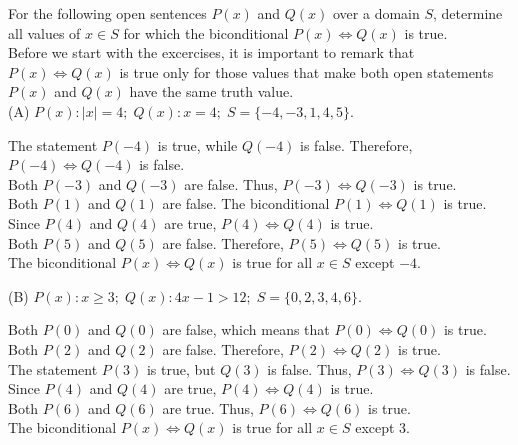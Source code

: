 \documentclass[12pt]{article}
\newenvironment{problem}[2][Problem]{\begin{trivlist}
		\item[\hskip \labelsep {\bfseries #1}\hskip \labelsep {\bfseries #2.}]}{\end{trivlist}}
\newenvironment{solution}[2][Solution]{\begin{trivlist}
		\item[\hskip \labelsep {\bfseries #1}\hskip \labelsep {\bfseries #2.}]}{\end{trivlist}}
\begin{document}
\begin{problem}{39}
	For the following open sentences $P(x)$ and $Q(x)$ over a domain $S$, determine all values of $x \in S$ for which the biconditional $P(x) \Leftrightarrow Q(x)$ is true.\\
	
	Before we start with the excercises, it is important to remark that $P(x) \Leftrightarrow Q(x)$ is true only for those values that make both open statements $P(x)$ and $Q(x)$ have the same truth value.\\
	
	(A) $P(x): \vert{x}\vert = 4; \; Q(x) : x = 4; \; S = \{-4, -3, 1, 4, 5\}.$	
	\begin{solution}{a}
		The statement $P(-4)$ is true, while $Q(-4)$ is false. Therefore, $P(-4) \Leftrightarrow Q(-4)$ is false.\\
		Both $P(-3)$ and $Q(-3)$ are false. Thus, $P(-3) \Leftrightarrow Q(-3)$ is true.\\
		Both $P(1)$ and $Q(1)$ are false. The biconditional $P(1) \Leftrightarrow Q(1)$ is true.\\
		Since $P(4)$  and $Q(4)$ are true, $P(4) \Leftrightarrow Q(4)$ is true.\\
		Both $P(5)$ and $Q(5)$ are false. Therefore, $P(5) \Leftrightarrow Q(5)$ is true.\\
		The biconditional $P(x) \Leftrightarrow Q(x)$ is true for all $x \in S$ except $-4$.
	\end{solution}

	(B) $P(x):x \geq 3; \; Q(x): 4x - 1 > 12; \; S=\{0,2,3,4,6\}$.
	\begin{solution}{b}
		Both $P(0)$ and $Q(0)$ are false, which means that $P(0) \Leftrightarrow Q(0)$ is true. \\
		Both $P(2)$ and $Q(2)$ are false. Therefore, $P(2) \Leftrightarrow Q(2)$ is true.\\
		The statement $P(3)$ is true, but $Q(3)$ is false. Thus, $P(3) \Leftrightarrow Q(3)$ is false.\\
		Since $P(4)$ and $Q(4)$ are true, $P(4) \Leftrightarrow Q(4)$ is true.\\
		Both $P(6)$ and $Q(6)$ are true. Thus, $P(6) \Leftrightarrow Q(6)$ is true.\\
		The biconditional $P(x) \Leftrightarrow Q(x)$ is true for all $x \in S$ except 3.
	\end{solution}


\end{problem}
\end{document}
